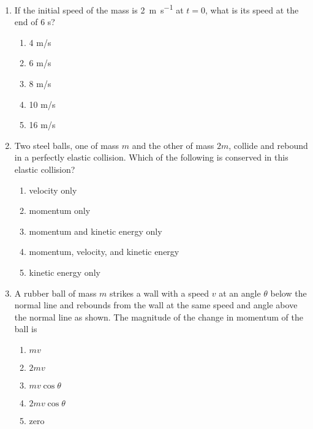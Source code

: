 \documentclass{../../../oss-apphys}
\begin{document}
\begin{multicols}{2}
\begin{enumerate}[leftmargin=18pt,resume]
  \item If the initial speed of the mass is \SI{2}{\metre\per\second} at $t=0$,
    what is its speed at the end of 6 s?
    \label{impulse2}
    \begin{enumerate}[nosep,leftmargin=18pt,label=(\Alph*)]
    \item 4 m/s
    \item 6 m/s
    \item 8 m/s
    \item 10 m/s
    \item 16 m/s
    \end{enumerate}
    \columnbreak
    
  \item Two steel balls, one of mass $m$ and the other of mass $2m$, collide and
    rebound in a perfectly elastic collision. Which of the following is
    conserved in this elastic collision?
    \begin{enumerate}[nosep,leftmargin=18pt,label=(\Alph*)]
    \item velocity only
    \item momentum only
    \item momentum and kinetic energy only
    \item momentum, velocity, and kinetic energy
    \item kinetic energy only
    \end{enumerate}
    \vspace{.8in}
    
  \item A rubber ball of mass $m$ strikes a wall with a speed $v$ at an angle
    $\theta$ below the normal line and rebounds from the wall at the same speed
    and angle above the normal line as shown. The magnitude of the change in
    momentum of the ball is
    \begin{center}
    \end{center}
    \begin{enumerate}[nosep,leftmargin=18pt,label=(\Alph*)]
    \item $mv$
    \item $2mv$
    \item $mv\cos\theta$
    \item $2mv\cos\theta$
    \item  zero
    \end{enumerate}
    \columnbreak
    

\end{enumerate}
\end{multicols}
\end{document}
